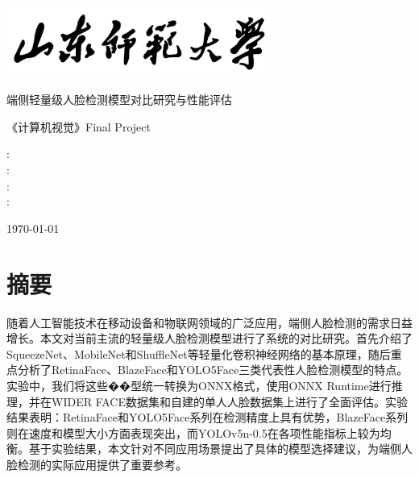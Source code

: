 \documentclass{article}
\begin{document}
\setcounter{page}{0}

\begin{titlepage}
    \centering
    \includegraphics[width=0.65\textwidth]{./imgs/logo_text.png}
    \par\vspace{1.5cm}
    {\Huge \heiti 端侧轻量级人脸检测模型对比研究与性能评估 \par}
    \vspace{1cm}
    {\Large \heiti 《计算机视觉》Final Project \par}
    \vspace{5cm}

    \begin{center}
        {\Large
        :\underline{}\\
        :\underline{}\\
        :\underline{}\\
        :\underline{}\\
        }
    \end{center}

    \vfill
    \today %
\end{titlepage}
\setcounter{page}{1}    %
\thispagestyle{empty}   %

\sectionfont{\centering}
\clearpage
\newpage

\setcounter{page}{1}
\section*{摘要}
随着人工智能技术在移动设备和物联网领域的广泛应用，端侧人脸检测的需求日益增长。本文对当前主流的轻量级人脸检测模型进行了系统的对比研究。首先介绍了SqueezeNet、MobileNet和ShuffleNet等轻量化卷积神经网络的基本原理，随后重点分析了RetinaFace、BlazeFace和YOLO5Face三类代表性人脸检测模型的特点。实验中，我们将这些��型统一转换为ONNX格式，使用ONNX Runtime进行推理，并在WIDER FACE数据集和自建的单人人脸数据集上进行了全面评估。实验结果表明：RetinaFace和YOLO5Face系列在检测精度上具有优势，BlazeFace系列则在速度和模型大小方面表现突出，而YOLOv5n-0.5在各项性能指标上较为均衡。基于实验结果，本文针对不同应用场景提出了具体的模型选择建议，为端侧人脸检测的实际应用提供了重要参考。
\end{document}
